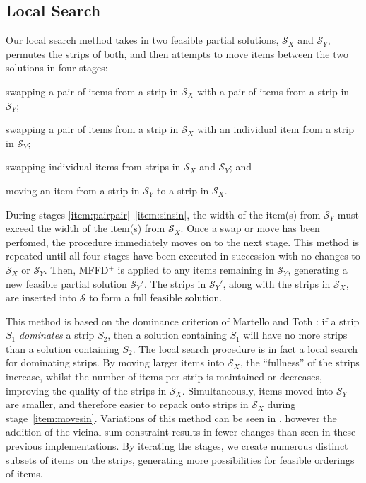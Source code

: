 \documentclass{elsarticle}
\begin{document}
\subsection{Local Search}
\label{sub:localsearch}
\noindent Our local search method takes in two feasible partial solutions, $\mathcal{S}_X$ and $\mathcal{S}_Y$, permutes the strips of both, and then attempts to move items between the two solutions in four stages: 
\begin{enumerate*}[label={(\roman*)}]
	\item swapping a pair of items from a strip in $\mathcal{S}_X$ with a pair of items from a strip in $\mathcal{S}_Y$;\label{item:pairpair}
	\item swapping a pair of items from a strip in $\mathcal{S}_X$ with an individual item from a strip in $\mathcal{S}_Y$;\label{item:pairsin}
	\item swapping individual items from strips in $\mathcal{S}_X$ and $\mathcal{S}_Y$;\label{item:sinsin} and
	\item moving an item from a strip in $\mathcal{S}_Y$ to a strip in $\mathcal{S}_X$.\label{item:movesin}
\end{enumerate*} 
During stages \ref{item:pairpair}--\ref{item:sinsin}, the width of the item(s) from $\mathcal{S}_Y$ must exceed the width of the item(s) from $\mathcal{S}_X$. Once a swap or move has been perfomed, the procedure immediately moves on to the next stage. This method is repeated until all four stages have been executed in succession with no changes to $\mathcal{S}_X$ or $\mathcal{S}_Y$. Then, MFFD$^+$ is applied to any items remaining in $\mathcal{S}_Y$, generating a new feasible partial solution $\mathcal{S}_Y'$. The strips in $\mathcal{S}_Y'$, along with the strips in $\mathcal{S}_X$, are inserted into $\mathcal{S}$ to form a full feasible solution.

This method is based on the dominance criterion of Martello and Toth \cite{martello1990l}: if a strip $S_1$ \emph{dominates} a strip $S_2$, then a solution containing $S_1$ will have no more strips than a solution containing $S_2$. The local search procedure is in fact a local search for dominating strips. By moving larger items into $\mathcal{S}_X$, the ``fullness'' of the strips increase, whilst the number of items per strip is maintained or decreases, improving the quality of the strips in $\mathcal{S}_X$. Simultaneously, items moved into $\mathcal{S}_Y$ are smaller, and therefore easier to repack onto strips in $\mathcal{S}_X$ during stage~\ref{item:movesin}. Variations of this method can be seen in \cite{lewis2009, lewis2017, falkenauer1996, levine2004}, however the addition of the vicinal sum constraint results in fewer changes than seen in these previous implementations. By iterating the stages, we create numerous distinct subsets of items on the strips, generating more possibilities for feasible orderings of items.
\end{document}
